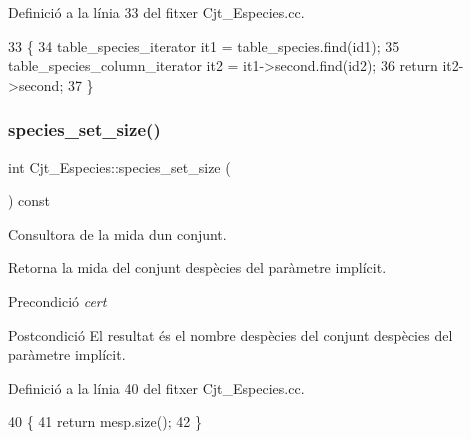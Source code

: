 Definició a la línia 33 del fitxer Cjt\+\_\+\+Especies.\+cc.


\begin{DoxyCode}
33                                                                   \{
34     table\_species\_iterator it1 = table\_species.find(id1);
35     table\_species\_column\_iterator it2 = it1->second.find(id2);
36     \textcolor{keywordflow}{return} it2->second;
37 \}
\end{DoxyCode}
\mbox{\label{class_cjt___especies_a011e96e195dfe5997d42e7937fe2099c}} 
\subsubsection{\texorpdfstring{species\+\_\+set\+\_\+size()}{species\_set\_size()}}
{\footnotesize\ttfamily int Cjt\+\_\+\+Especies\+::species\+\_\+set\+\_\+size (\begin{DoxyParamCaption}{ }\end{DoxyParamCaption}) const}



Consultora de la mida d\textquotesingle{}un conjunt. 

Retorna la mida del conjunt d\textquotesingle{}espècies del paràmetre implícit.

\begin{DoxyPrecond}{Precondició}
{\itshape cert} 
\end{DoxyPrecond}
\begin{DoxyPostcond}{Postcondició}
El resultat és el nombre d\textquotesingle{}espècies del conjunt d\textquotesingle{}espècies del paràmetre implícit. 
\end{DoxyPostcond}


Definició a la línia 40 del fitxer Cjt\+\_\+\+Especies.\+cc.


\begin{DoxyCode}
40                                         \{
41     \textcolor{keywordflow}{return} mesp.size();
42 \}
\end{DoxyCode}
\mbox{\label{class_cjt___especies_a2ce9d7a4968d46686109477f448857ea}} 
